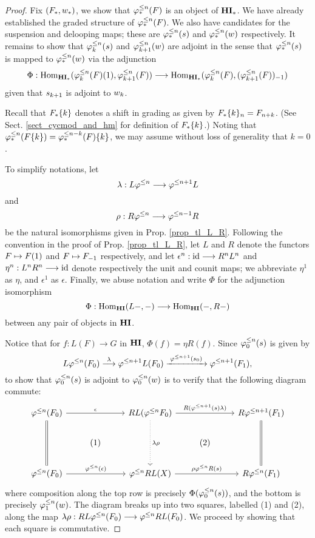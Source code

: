 \begin{proof}
Fix $(F_*, \deloop_*)$, we show that $\tlHM{n}(F)$ is an object of
$\HM$. We have already established the graded structure of 
$\tlHM{n}(F)$. We also have candidates for the suspension and 
delooping maps; these are $\suspTL{n}$ and $\deloopTL{n}$ 
respectively. It remains to show that $\suspTL[k]{n}$ and 
$\deloopTL[k + 1]{n}$ are adjoint in the sense that $\suspTL{n}$ is 
mapped to $\deloopTL{n}$ via the adjunction 
\[
\Phi: \homHM(\LHI{\tlHM[k]{n}(F)}, \tlHM[k + 1]{n}(F))
\to \homHM(\tlHM[k]{n}(F), \RHI{(\tlHM[k + 1]{n}(F))})
\]
given that $\susp_{k + 1}$ is adjoint to $\deloop_k$.

Recall that $\shift[k]{F_*}$ denotes a shift in grading as given by 
$\shift[k]{F_*}_n = F_{n + k}$. (See Sect. \ref{sect_cycmod_and_hm} 
for definition of $\shift[k]{F_*}$.) Noting that 
$\tlHM{n}(\shift[k]{F}) = \shift[k]{\tlHM{n - k}(F)}$, we may 
assume without loss of generality that $k = 0$. 

To simplify notations, let
\[
\lambda : L\tlHI{n} \to \tlHI{n + 1}L
\]
and 
\[
\rho : R\tlHI{n} \to \tlHI{n - 1}R
\]
be the natural isomorphisms given in Prop. \ref{prop_tl_L_R}. 
Following the convention in the proof of Prop. \ref{prop_tl_L_R}, 
let $L$ and $R$ denote the functors $F \mapsto \LHI{F}$ and $F 
\mapsto \RHI{F}$ respectively, and let $\epsilon^n : \id \to 
R^nL^n$ and $\eta^n: L^nR^n \to \id$ denote respectively the unit 
and counit maps; we abbreviate $\eta^1$ as $\eta$, and $\epsilon^1$
as $\epsilon$. Finally, we abuse notation and write $\Phi$ for the 
adjunction isomorphism
\[
\Phi: \homHI(L-, -) \to \homHI(-,R-)
\]
between any pair of objects in $\HI$.

Notice that for $f: L(F) \to G$ in $\HI$, $\Phi(f) = \eta R(f)$.
Since $\suspTL[0]{n}$ is given by
\[
L\tlHI{n}(F_0) \stackrel{\lambda}{\to} \tlHI{n + 1} L(F_0)
   \xrightarrow{\;\tlHI{n + 1}(\susp_0)\;} \tlHI{n + 1}(F_1),
\]
to show that $\suspTL[0]{n}$ is adjoint to $\deloopTL[0]{n}$ is to
verify that the following diagram commute:
\[
\begin{tikzcd}
\tlHI{n}(F_0) \arrow{rr}{\epsilon} \arrow[equals]{dd} &&
RL (\tlHI{n}F_0) \arrow{rr}{R(\tlHI{n + 1}(\susp) \lambda)} 
\arrow[dotted]{dd}{\lambda \rho}&&
R \tlHI{n + 1} (F_1) \arrow[equals]{dd} \\
& (1) && (2) \\
\tlHI{n}(F_0) \arrow{rr}{\tlHI{n}(\epsilon)} &&
\tlHI{n} RL(X) \arrow{rr}{\rho \tlHI{n} R(\susp)} &&
R\tlHI{n}(F_1)
\end{tikzcd}
\]
where composition along the top row is precisely 
$\Phi(\suspTL[0]{n})$, and the bottom is precisely 
$\deloopTL[1]{n}$. The diagram breaks up into two squares,
labelled (1) and (2), along the map $\lambda \rho: RL 
\tlHI{n}(F_0) \to \tlHI{n} RL(F_0)$. We proceed by showing that 
each square is commutative.


\end{proof}
